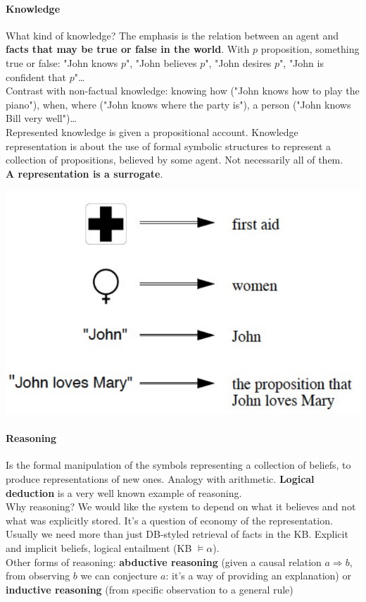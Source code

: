 \documentclass[10pt]{report}
\begin{document}
\paragraph{Knowledge} What kind of knowledge? The emphasis is the relation between an agent and \textbf{facts that may be true or false in the world}. With $p$ proposition, something true or false: "John knows $p$", "John believes $p$", "John desires $p$", "John is confident that $p$"\ldots\\
Contrast with non-factual knowledge: knowing how ("John knows how to play the piano"), when, where ("John knows where the party is"), a person ("John knows Bill very well")\ldots\\
Represented knowledge is given a propositional account. Knowledge representation is about the use of formal symbolic structures to represent a collection of propositions, believed by some agent. Not necessarily all of them.\\
\textbf{A representation is a surrogate}.
\begin{center}
	\includegraphics[scale=0.5]{11.png}
\end{center}
\paragraph{Reasoning} Is the formal manipulation of the symbols representing a collection of beliefs, to produce representations of new ones. Analogy with arithmetic. \textbf{Logical deduction} is a very well known example of reasoning.\\
Why reasoning? We would like the system to depend on what it believes and not what was explicitly stored. It's a question of economy of the representation.\\
Usually we need more than just DB-styled retrieval of facts in the KB. Explicit and implicit beliefs, logical entailment (KB $\vDash \alpha$).\\
Other forms of reasoning: \textbf{abductive reasoning} (given a causal relation $a\Rightarrow b$, from observing $b$ we can conjecture $a$: it's a way of providing an explanation) or \textbf{inductive reasoning} (from specific observation to a general rule)
\end{document}
